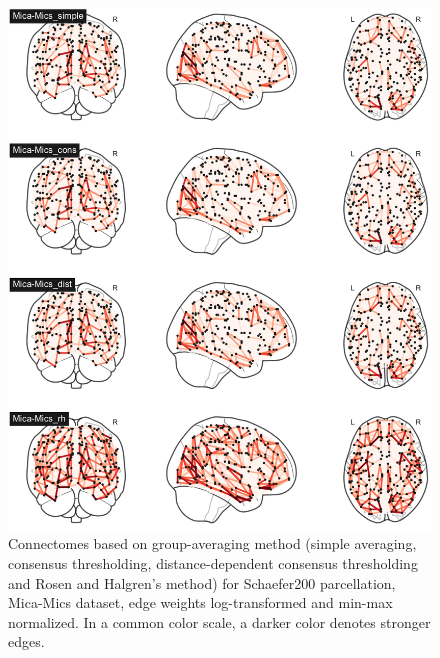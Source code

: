 \begin{figure}[p]
  \begin{center}
    \includegraphics[width=\textwidth]{images/manually_created/mica.png}
  \end{center}
  \caption[Connectomes based on preprocessing method]{Connectomes based on group-averaging method (simple averaging, consensus thresholding, distance-dependent consensus thresholding and Rosen and Halgren's method) for Schaefer200 parcellation, Mica-Mics dataset, edge weights log-transformed and min-max normalized. In a common color scale, a darker color denotes stronger edges.}
  \label{fig:connectomes_mica}
\end{figure}

